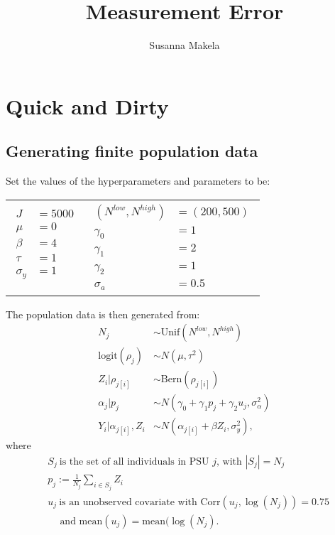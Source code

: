 \documentclass[10pt,a4paper]{article}
\title{Measurement Error}
\author{Susanna Makela}
\begin{document}
\maketitle

\section*{Quick and Dirty}
\subsection*{Generating finite population data}
Set the values of the hyperparameters and parameters to be:

\begin{center}
	\begin{tabular}{cc} 
		{$\!\begin{aligned}
			J &= 5000 \\
			\mu &= 0 \\
			\beta &= 4 \\
			\tau &= 1 \\
			\sigma_y &= 1 \\ \end{aligned}$} & {$\!\begin{aligned}
			(N^{low}, N^{high}) &= (200, 500) \\
			\gamma_0 &= 1 \\
			\gamma_1 &= 2 \\
			\gamma_2 &= 1 \\
			\sigma_a &= 0.5 \end{aligned}$}
	\end{tabular}
\end{center}
The population data is then generated from:
\begin{align*}
	N_j &\sim \mathrm{Unif}(N^{low}, N^{high}) \\
	\mathrm{logit}(\rho_j) &\sim N(\mu, \tau^2) \\
	Z_i | \rho_{j[i]} &\sim \mathrm{Bern}(\rho_{j[i]}) \\
	\alpha_j | p_j &\sim N(\gamma_0 + \gamma_1 p_j + \gamma_2 u_j, \sigma_{\alpha}^2) \\
	Y_i | \alpha_{j[i]}, Z_i &\sim N(\alpha_{j[i]} + \beta Z_i, \sigma_y^2),
\end{align*}
where
\begin{align*}
	&S_j ~ \textrm{is the set of all individuals in PSU $j$, with $|S_j|=N_j$} \\
	&p_j := \frac{1}{N_j} \sum_{i \in S_j} Z_i \\
	&u_j ~\textrm{is an unobserved covariate with Corr}(u_j, \log(N_j)) = 0.75 \\
	&\quad~ \textrm{and mean}(u_j)= \mathrm{ mean(}\log(N_j).
\end{align*}
\end{document}

